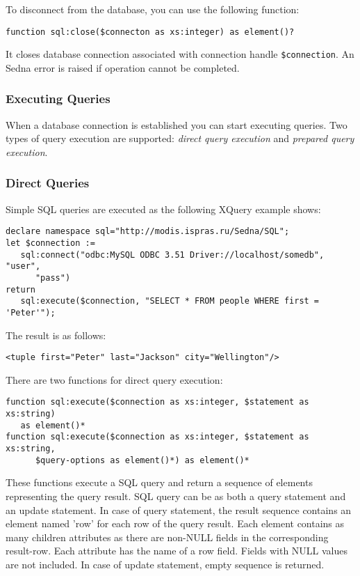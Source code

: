 \documentclass[a4paper,12pt]{article}
\begin{document}
To disconnect from the database, you can use the following function:
\begin{verbatim}function sql:close($connecton as xs:integer) as element()?\end{verbatim}

It closes database connection associated with connection handle \verb!$connection!.
An Sedna error is raised if operation cannot be completed.

\subsubsection*{Executing Queries}
When a database connection is established you can start executing queries. Two types of
query execution are supported: \emph{direct query execution} and \emph{prepared query execution}.

\subsubsection*{Direct Queries}
Simple SQL queries are executed as the following XQuery example shows:
\small{
\begin{verbatim}
declare namespace sql="http://modis.ispras.ru/Sedna/SQL";
let $connection :=
   sql:connect("odbc:MySQL ODBC 3.51 Driver://localhost/somedb", "user",
      "pass")
return
   sql:execute($connection, "SELECT * FROM people WHERE first = 'Peter'");
\end{verbatim}
}

The result is as follows:
\small{
\begin{verbatim}
<tuple first="Peter" last="Jackson" city="Wellington"/>
\end{verbatim}
}
There are two functions for direct query execution:
\begin{verbatim}
function sql:execute($connection as xs:integer, $statement as xs:string)
   as element()*
function sql:execute($connection as xs:integer, $statement as xs:string,
      $query-options as element()*) as element()*
\end{verbatim}
These functions execute a SQL query and return a sequence of elements representing the query result. SQL query can be as
both a query statement and an update statement. In case of query statement, the result sequence contains an element named 'row' for each row of the query result. Each element contains as many children attributes as there are non-NULL fields in the corresponding result-row.
Each attribute has the name of a row field. Fields with NULL values are not included. In case of update statement, empty sequence is returned.
\end{document}
